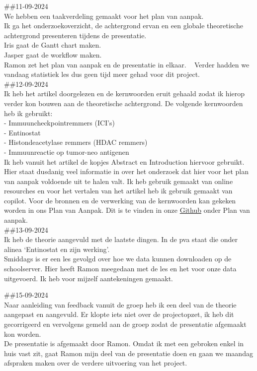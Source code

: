 \documentclass[
]{article}
\begin{document}
\#\#11-09-2024\\
We hebben een taakverdeling gemaakt voor het plan van aanpak.\\
Ik ga het onderzoekoverzicht, de achtergrond ervan en een globale
theoretische achtergrond presenteren tijdens de presentatie.\\
Iris gaat de Gantt chart maken.\\
Jasper gaat de workflow maken.\\
Ramon zet het plan van aanpak en de presentatie in elkaar. ~ Verder
hadden we vandaag statistiek les dus geen tijd meer gehad voor dit
project.\\

\#\#12-09-2024\\
Ik heb het artikel doorgelezen en de kernwoorden eruit gehaald zodat ik
hierop verder kon bouwen aan de theoretische achtergrond. De volgende
kernwoorden heb ik gebruikt:\\
- Immuuncheckpointremmers (ICI's)\\
- Entinostat\\
- Histondeacetylase remmers (HDAC remmers)\\
- Immuunreactie op tumor-neo antigenen\\

Ik heb vanuit het artikel de kopjes Abstract en Introduction hiervoor
gebruikt. Hier staat dusdanig veel informatie in over het onderzoek dat
hier voor het plan van aanpak voldoende uit te halen valt. Ik heb
gebruik gemaakt van online resourches en voor het vertalen van het
artikel heb ik gebruik gemaakt van copilot. Voor de bronnen en de
verwerking van de kernwoorden kan gekeken worden in ons Plan van Aanpak.
Dit is te vinden in onze
\href{https://github.com/RamonReilman/GenomicsTranscriptomics}{Github}
onder Plan van aanpak.\\

\#\#13-09-2024\\
Ik heb de theorie aangevuld met de laatste dingen. In de pva staat die
onder alinea `Entinostat en zijn werking'.\\
Smiddags is er een les gevolgd over hoe we data kunnen downloaden op de
schoolserver. Hier heeft Ramon meegedaan met de les en het voor onze
data uitgevoerd. Ik heb voor mijzelf aantekeningen gemaakt.

\#\#15-09-2024\\
Naar aanleiding van feedback vanuit de groep heb ik een deel van de
theorie aangepast en aangevuld. Er klopte iets niet over de
projectopzet, ik heb dit gecorrigeerd en vervolgens gemeld aan de groep
zodat de presentatie afgemaakt kon worden.\\
De presentatie is afgemaakt door Ramon. Omdat ik met een gebroken enkel
in huis vast zit, gaat Ramon mijn deel van de presentatie doen en gaan
we maandag afspraken maken over de verdere uitvoering van het project.
\end{document}

